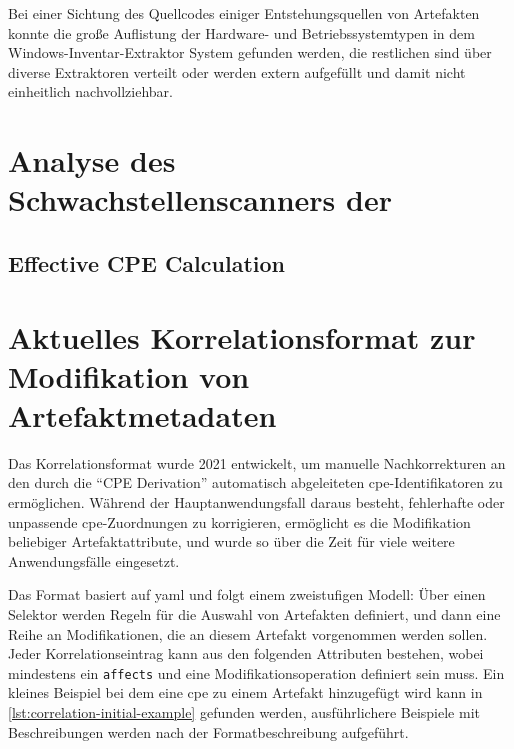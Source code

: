 Bei einer Sichtung des Quellcodes einiger Entstehungsquellen von Artefakten konnte die große Auflistung der Hardware- und Betriebssystemtypen in dem Windows-Inventar-Extraktor System gefunden werden, die restlichen sind über diverse Extraktoren verteilt oder werden extern aufgefüllt und damit nicht einheitlich nachvollziehbar.



\section{Analyse des Schwachstellenscanners der \metaeffektlg}


\subsection{Effective CPE Calculation}\label{subsec:effective-cpe-calculation}


\section{Aktuelles Korrelationsformat zur Modifikation von Artefaktmetadaten}\label{sec:current-correlation-format}

Das Korrelationsformat wurde 2021 entwickelt, um manuelle Nachkorrekturen an den durch die \enquote{CPE Derivation} automatisch abgeleiteten \acrshort{cpe}-Identifikatoren zu ermöglichen.
Während der Hauptanwendungsfall daraus besteht, fehlerhafte oder unpassende \acrshort{cpe}-Zuordnungen zu korrigieren, ermöglicht es die Modifikation beliebiger Artefaktattribute, und wurde so über die Zeit für viele weitere Anwendungsfälle eingesetzt.

Das Format basiert auf \acrfull{yaml} und folgt einem zweistufigen Modell:
Über einen Selektor werden Regeln für die Auswahl von Artefakten definiert, und dann eine Reihe an Modifikationen, die an diesem Artefakt vorgenommen werden sollen.
Jeder Korrelationseintrag kann aus den folgenden Attributen bestehen, wobei mindestens ein \texttt{affects} und eine Modifikationsoperation definiert sein muss.
Ein kleines Beispiel bei dem eine \acrshort{cpe} zu einem Artefakt hinzugefügt wird kann in \autoref{lst:correlation-initial-example} gefunden werden, ausführlichere Beispiele mit Beschreibungen werden nach der Formatbeschreibung aufgeführt.

